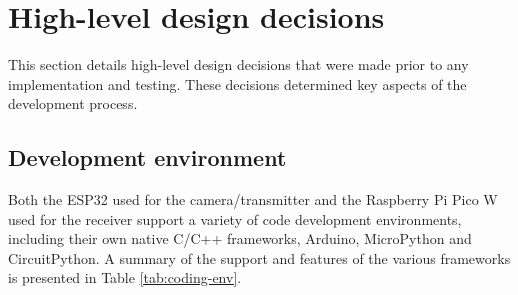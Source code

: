 \documentclass[class=report,11pt,crop=false]{standalone}
\begin{document}
\section{High-level design decisions } \label{s:firmware-design-decisions}

This section details high-level design decisions that were made prior to any implementation and testing. These decisions determined key aspects of the development process.

\subsection{Development environment}

Both the ESP32 used for the camera/transmitter and the Raspberry Pi Pico W used for the receiver support a variety of code development environments, including their own native C/C++ frameworks, Arduino, MicroPython and CircuitPython. A summary of the support and features of the various frameworks is presented in Table \ref{tab:coding-env}.
\end{document}
